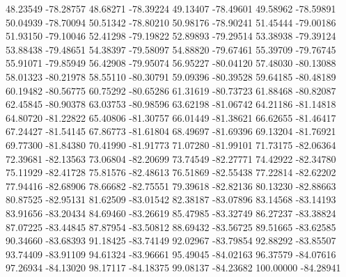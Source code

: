 {48.23549 -78.28757
48.68271 -78.39224
49.13407 -78.49601
49.58962 -78.59891
50.04939 -78.70094
50.51342 -78.80210
50.98176 -78.90241
51.45444 -79.00186
51.93150 -79.10046
52.41298 -79.19822
52.89893 -79.29514
53.38938 -79.39124
53.88438 -79.48651
54.38397 -79.58097
54.88820 -79.67461
55.39709 -79.76745
55.91071 -79.85949
56.42908 -79.95074
56.95227 -80.04120
57.48030 -80.13088
58.01323 -80.21978
58.55110 -80.30791
59.09396 -80.39528
59.64185 -80.48189
60.19482 -80.56775
60.75292 -80.65286
61.31619 -80.73723
61.88468 -80.82087
62.45845 -80.90378
63.03753 -80.98596
63.62198 -81.06742
64.21186 -81.14818
64.80720 -81.22822
65.40806 -81.30757
66.01449 -81.38621
66.62655 -81.46417
67.24427 -81.54145
67.86773 -81.61804
68.49697 -81.69396
69.13204 -81.76921
69.77300 -81.84380
70.41990 -81.91773
71.07280 -81.99101
71.73175 -82.06364
72.39681 -82.13563
73.06804 -82.20699
73.74549 -82.27771
74.42922 -82.34780
75.11929 -82.41728
75.81576 -82.48613
76.51869 -82.55438
77.22814 -82.62202
77.94416 -82.68906
78.66682 -82.75551
79.39618 -82.82136
80.13230 -82.88663
80.87525 -82.95131
81.62509 -83.01542
82.38187 -83.07896
83.14568 -83.14193
83.91656 -83.20434
84.69460 -83.26619
85.47985 -83.32749
86.27237 -83.38824
87.07225 -83.44845
87.87954 -83.50812
88.69432 -83.56725
89.51665 -83.62585
90.34660 -83.68393
91.18425 -83.74149
92.02967 -83.79854
92.88292 -83.85507
93.74409 -83.91109
94.61324 -83.96661
95.49045 -84.02163
96.37579 -84.07616
97.26934 -84.13020
98.17117 -84.18375
99.08137 -84.23682
100.00000 -84.28941
}

\def\DataGroupDummyXmin{1}
\def\DataGroupDummyXmax{100}
\def\DataGroupDummyYmin{-85}
\def\DataGroupDummyYmax{-0}
\def\DataGroupDummyDxV{20}
\def\DataGroupDummyDyV{17}
